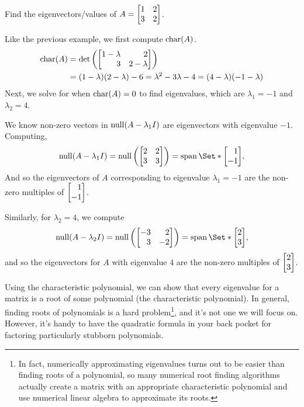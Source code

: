 \begin{example}
	Find the eigenvectors/values of $A=\mat{1&2\\3&2}$.

	Like the previous example, we first compute $\operatorname{char}(A)$.
	\begin{align*}
	    \Char(A)&=\det\left(\mat{1-\lambda&2\\3&2-\lambda}\right)\\
	            &=(1-\lambda)(2-\lambda)-6=\lambda^2-3\lambda-4=(4-\lambda)(-1-\lambda)
	\end{align*}
	Next, we solve for when
	$\operatorname{char}(A)=0$ to find eigenvalues, 
	which are $\lambda_1=-1$ and $\lambda_2=4$. 
	
	We know non-zero vectors in $\operatorname{null}(A-\lambda_1I)$ are eigenvectors with eigenvalue $-1$. Computing, 
	\[
	\Null(A-\lambda_1I) = \Null\left(\mat{2&2\\3&3}\right)=
	\Span\Set*{\mat{1\\-1}},
	\]
	And so the eigenvectors of $A$ corresponding to eigenvalue $\lambda_1=-1$
	are the non-zero multiples of $\mat{1\\-1}$.
	
	Similarly, for $\lambda_2=4$, we compute
	\[
	\Null(A-\lambda_2I) = \Null\left(\mat{-3&2\\3&-2}\right)=
	\Span\Set*{\mat{2\\3}},
	\]
	and so the eigenvectors for $A$ with eigenvalue $4$ are the non-zero multiples of $\mat{2\\3}$.
	
\end{example}

Using the characteristic polynomial, we can show that every eigenvalue
for a matrix is a root of some polynomial (the characteristic polynomial).
In general, finding roots of polynomials is a hard problem\footnote{ In fact,
numerically approximating eigenvalues turns out to be easier than finding roots
of a polynomial, so many numerical root finding algorithms actually create a matrix
with an appropriate characteristic polynomial and use numerical linear
algebra to approximate its roots.}, and it's not one we will focus on. However, it's
handy to have the quadratic formula in your back pocket for factoring particularly
stubborn polynomials.

